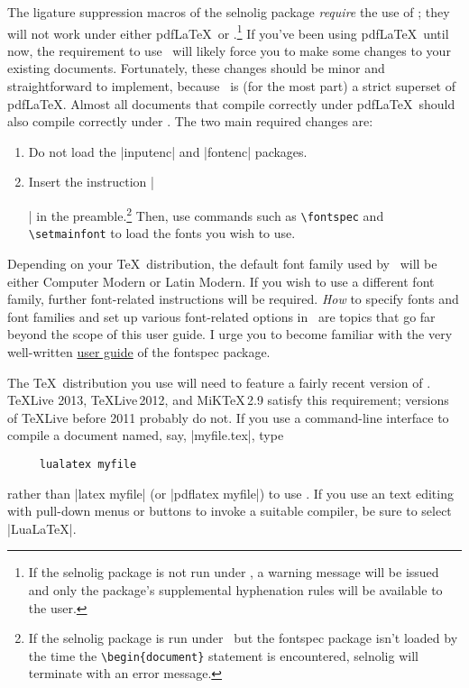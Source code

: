\documentclass[11pt]{article}
\newcommand{\pkg}[1]{\textsf{#1}}
\newcommand{\cmmd}[1]{\texttt{\textbackslash #1}}
\begin{document}
\begingroup
\renewcommand\theenumi{(\roman{enumi})}
\renewcommand\labelenumi\theenumi

The ligature suppression macros of the \pkg{selnolig} package \emph{require} the use of \LuaLaTeX; they will not work under either pdf\LaTeX\ or \XeLaTeX.\footnote{If the \pkg{selnolig} package is not run under \LuaLaTeX, a warning message will be issued and only the package's supplemental hyphenation rules will be available to the user.}
If you've been using pdf\LaTeX\ until now, the requirement to use \LuaLaTeX\ will likely force you to make some changes to your existing documents. Fortunately, these changes should be minor and straightforward to implement, because \LuaLaTeX\ is (for the most part) a strict superset of pdf\LaTeX. Almost all documents that compile correctly under pdf\LaTeX\ should also compile correctly under \LuaLaTeX.
The two main required changes are: 
\begin{enumerate}
\item Do not load the |inputenc| and |fontenc| packages. \item Insert the instruction |\usepackage{fontspec}|
in the preamble.\footnote{If the \pkg{selnolig} package is run under \LuaLaTeX\ but the \pkg{fontspec} package isn't loaded by the time the \Verb+\begin{document}+ statement is encountered, \pkg{selnolig} will terminate with an error message.} Then, use commands such as \cmmd{fontspec} and \cmmd{setmainfont} to load the fonts you wish to use.
\end{enumerate}
\endgroup


Depending on your \TeX\ distribution, the default font family used by \LuaLaTeX\ will be either Computer Modern or Latin Modern. If you wish to use a different font family, further font-related instructions will be required. \emph{How} to specify fonts and font families and set up various font-related options in \LuaLaTeX\ are topics that go far beyond the scope of this user guide. I urge you to become familiar with the very well-written
 \href{http://www.ctan.org/tex-archive/macros/latex/contrib/fontspec/fontspec.pdf}{user guide} of the \pkg{fontspec} package.

The \TeX\ distribution you use will need to feature a fairly recent version of \LuaLaTeX. \TeX Live 2013, \TeX Live\,2012, and MiK\TeX\,2.9 satisfy this requirement; versions of \TeX Live before 2011 probably do not. If you use a command-line interface to compile a document named, say, |myfile.tex|, type 
\begin{Verbatim}
     lualatex myfile
\end{Verbatim}
rather than |latex myfile| (or |pdflatex myfile|) to use \LuaLaTeX. If you use an text editing with pull-down menus or buttons to invoke a suitable compiler, be sure to select |LuaLaTeX|. 
\end{document}
